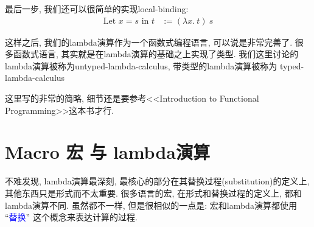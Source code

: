 \documentclass{article}
\begin{document}
最后一步, 我们还可以很简单的实现local-binding:
\begin{align*}
  \mbox{Let $x = s$ in $t$} &:= (\lambda x.\ t)\ s
\end{align*}

这样之后, 我们的lambda演算作为一个函数式编程语言, 可以说是非常完善了.
很多函数式语言, 其实就是在lambda演算的基础之上实现了类型.
我们这里讨论的lambda演算被称为untyped-lambda-calculus, 带类型的lambda演算被称为
typed-lambda-calculus

这里写的非常的简略, 细节还是要参考<<Introduction to Functional Programming>>这本书才行.
\section{Macro 宏 与 lambda演算}
不难发现, lambda演算最深刻, 最核心的部分在其替换过程(substitution)的定义上, 其他东西只是形式而不太重要.
很多语言的宏, 在形式和替换过程的定义上, 都和lambda演算不同.
虽然都不一样, 但是很相似的一点是: 宏和lambda演算都使用 ``\textcolor{blue}{替换}'' 这个概念来表达计算的过程.
\end{document}

